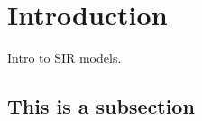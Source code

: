 \section{Introduction}\label{Introduction}\thispagestyle{SectionFirstPage} %
Intro to SIR models.

\subsection{This is a subsection}
